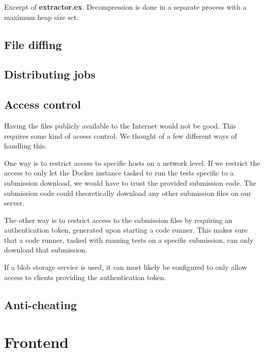 \begin{listing}
    \inputminted[firstline=77,lastline=100]{elixir}{code/server/lib/thesis/extractor.ex}
    \caption{Excerpt of \textbf{extractor.ex}. Decompression is done in a separate process with a maximum heap size set.}
    \label{lst:decompression_limit}
\end{listing}

\subsection{File diffing}

\subsection{Distributing jobs}

\subsection*{Access control}

Having the files publicly available to the Internet would not be good. This requires some kind of access control. We thought of a few different ways of handling this.

One way is to restrict access to specific hosts on a network level. If we restrict the access to only let the Docker instance tasked to run the tests specific to a submission download, we would have to trust the provided submission code. The submission code could theoretically download any other submission files on our server.

The other way is to restrict access to the submission files by requiring an authentication token, generated upon starting a code runner. This makes sure that a code runner, tasked with running tests on a specific submission, can only download that submission.

If a blob storage service is used, it can most likely be configured to only allow access to clients providing the authentication token.

\subsection{Anti-cheating}

\section{Frontend}

